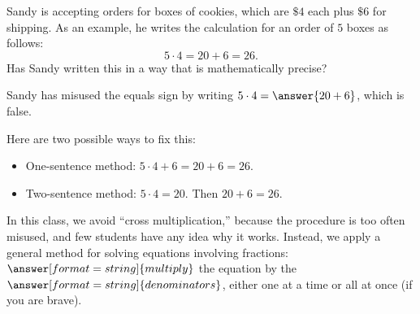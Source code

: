 \documentclass[nooutcomes]{ximera}
\begin{document}
\begin{problem}
Sandy is accepting orders for boxes of cookies, which are $\$4$ each plus $\$6$ for shipping.  As an example, he writes the calculation for an order of $5$ boxes as follows: 
\[
5\cdot 4 = 20 + 6 = 26.
\]
Has Sandy written this in a way that is mathematically precise?  
\begin{multipleChoice}
\end{multipleChoice}
\begin{problem}
Sandy has misused the equals sign by writing $5\cdot 4 = \answer{20 + 6}$, which is false.  

Here are two possible ways to fix this: 
\begin{itemize}
\item One-sentence method: $5\cdot 4 + 6 = 20 + 6 = 26$.
\item Two-sentence method: $5\cdot 4 = 20$.  Then $20 + 6 = 26$.
\end{itemize}
\end{problem}
\end{problem}

\begin{problem}
In this class, we avoid ``cross multiplication,'' because the procedure is too often misused, and few students have any idea why it works.  Instead, we apply a general method for solving equations involving fractions: $\answer[format=string]{multiply}$ the equation by the $\answer[format=string]{denominators}$, either one at a time or all at once (if you are brave).  
\end{problem}
\end{document}
